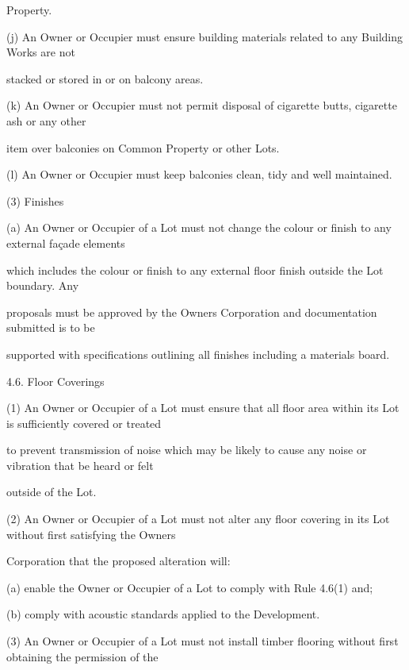 \documentclass{article}
\begin{document}
{\fontsize{10.02}{1}Property. }

{\fontsize{9.962}{1}(j) An Owner or Occupier must ensure building materials related to any Building Works are not }

{\fontsize{10.02}{1}stacked or stored in or on balcony areas. }

{\fontsize{9.962}{1}(k) An Owner or Occupier must not permit disposal of cigarette butts, cigarette ash or any other }

{\fontsize{10.02}{1}item over balconies on Common Property or other Lots. }

{\fontsize{9.962}{1}(l) An Owner or Occupier must keep balconies clean, tidy and well maintained. }

{\fontsize{9.962}{1}(3) Finishes }

{\fontsize{9.962}{1}(a) An Owner or Occupier of a Lot must not change the colour or finish to any external façade elements }

{\fontsize{10.02}{1}which includes the colour or finish to any external floor finish outside the Lot boundary. Any }

{\fontsize{10.02}{1}proposals must be approved by the Owners Corporation and documentation submitted is to be }

{\fontsize{10.02}{1}supported with specifications outlining all finishes including a materials board. }

{\fontsize{9.99}{1}4.6. Floor Coverings }

{\fontsize{9.962}{1}(1) An Owner or Occupier of a Lot must ensure that all floor area within its Lot is sufficiently covered or treated }

{\fontsize{10.02}{1}to prevent transmission of noise which may be likely to cause any noise or vibration that be heard or felt }

{\fontsize{10.02}{1}outside of the Lot. }

{\fontsize{9.962}{1}(2) An Owner or Occupier of a Lot must not alter any floor covering in its Lot without first satisfying the Owners }

{\fontsize{10.02}{1}Corporation that the proposed alteration will: }

{\fontsize{9.962}{1}(a) enable the Owner or Occupier of a Lot to comply with Rule 4.6(1) and; }

{\fontsize{9.962}{1}(b) comply with acoustic standards applied to the Development. }

{\fontsize{9.962}{1}(3) An Owner or Occupier of a Lot must not install timber flooring without first obtaining the permission of the }
\end{document}
